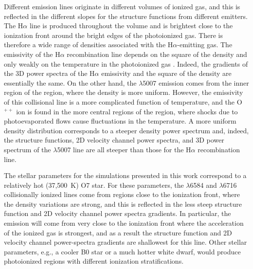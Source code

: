 \documentclass[useAMS,usenatbib]{mn2e}
\begin{document}
Different emission lines originate in different volumes of ionized
gas, and this is reflected in the different slopes for the structure
functions from different emitters. The H$\alpha$ line is produced
throughout the volume and is brightest close to the ionization front
around the bright edges of the photoionized gas. There is therefore a
wide range of densities associated with the H$\alpha$-emitting
gas. The emissivity of the H$\alpha$ recombination line depends on the
square of the density and only weakly on the temperature in the
photoionized gas \citep[see e.g.,][]{2006agna.book.....O}. Indeed, the
gradients of the 3D power spectra of the H$\alpha$ emissivity and
the square of the density are essentially the same. On the other hand,
the \oiii$\lambda$5007 emission comes from the inner region of the
\hii{} region, where the density is more uniform. However, the emissivity
of this collisional line is a more complicated function of
temperature, and the O$^{++}$ ion is found in the more central regions
of the \hii{} region, where shocks due to photoevaporated flows cause
fluctuations in the temperature. A more uniform density distribution
corresponds to a steeper density power spectrum and, indeed, the
structure functions, 2D velocity channel power spectra, and 3D power
spectrum of the \oiii$\lambda$5007 line are all steeper than those
for the H$\alpha$ recombination line.

The stellar parameters for the simulations presented in this work
correspond to a relatively hot (37,500~K) O7 star. For these
parameters, the \nii$\lambda$6584 and \sii$\lambda$6716
collisionally ionized lines come from regions close to the ionization
front, where the density variations are strong, and this is reflected
in the less steep structure function and 2D velocity channel power
spectra gradients. In particular, the \sii{} emission will come from
very close to the ionization front where the acceleration of the
ionized gas is strongest, and as a result the structure function and
2D velocity channel power-spectra gradients are shallowest for this
line. Other stellar parameters, e.g., a cooler B0 star or a much
hotter white dwarf, would produce photoionized regions with 
different ionization stratifications.

\end{document}
